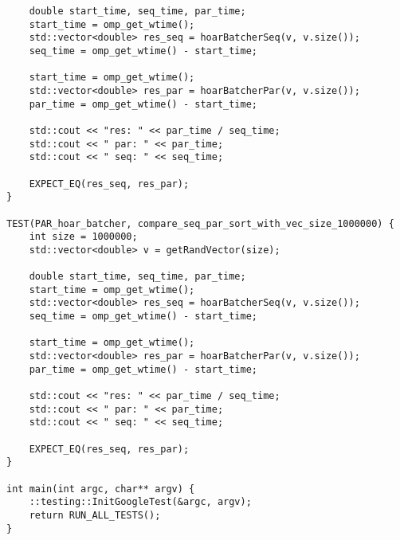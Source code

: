 \documentclass{report}
\begin{document}
\begin{lstlisting}
    double start_time, seq_time, par_time;
    start_time = omp_get_wtime();
    std::vector<double> res_seq = hoarBatcherSeq(v, v.size());
    seq_time = omp_get_wtime() - start_time;

    start_time = omp_get_wtime();
    std::vector<double> res_par = hoarBatcherPar(v, v.size());
    par_time = omp_get_wtime() - start_time;

    std::cout << "res: " << par_time / seq_time;
    std::cout << " par: " << par_time;
    std::cout << " seq: " << seq_time;

    EXPECT_EQ(res_seq, res_par);
}

TEST(PAR_hoar_batcher, compare_seq_par_sort_with_vec_size_1000000) {
    int size = 1000000;
    std::vector<double> v = getRandVector(size);

    double start_time, seq_time, par_time;
    start_time = omp_get_wtime();
    std::vector<double> res_seq = hoarBatcherSeq(v, v.size());
    seq_time = omp_get_wtime() - start_time;

    start_time = omp_get_wtime();
    std::vector<double> res_par = hoarBatcherPar(v, v.size());
    par_time = omp_get_wtime() - start_time;

    std::cout << "res: " << par_time / seq_time;
    std::cout << " par: " << par_time;
    std::cout << " seq: " << seq_time;

    EXPECT_EQ(res_seq, res_par);
}

int main(int argc, char** argv) {
    ::testing::InitGoogleTest(&argc, argv);
    return RUN_ALL_TESTS();
}

\end{lstlisting}
\newpage
\end{document}
